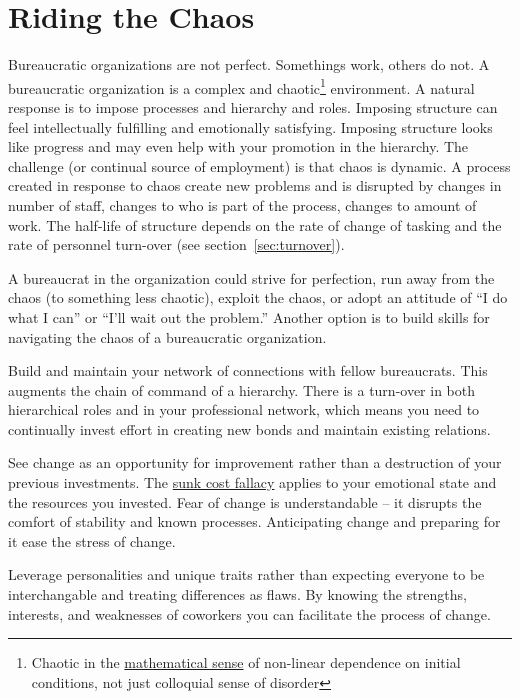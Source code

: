\section{Riding the Chaos}

Bureaucratic organizations are not perfect. Somethings work, others do not. A bureaucratic organization is a complex and chaotic\footnote{Chaotic in the \href{https://en.wikipedia.org/wiki/Chaos_theory}{mathematical sense} of non-linear dependence on initial conditions, not just colloquial sense of disorder} environment. A natural response is to impose processes and hierarchy and roles. Imposing structure can feel intellectually fulfilling and emotionally satisfying. Imposing structure looks like progress and may even help with your promotion in the hierarchy. The challenge (or continual source of employment) is that chaos is dynamic. A process created in response to chaos create new problems and is disrupted by changes in number of staff, changes to who is part of the process, changes to amount of work. The half-life of structure depends on the rate of change of tasking and the rate of personnel turn-over (see section~\ref{sec:turnover}).

A bureaucrat in the organization could strive for perfection, run away from the chaos (to something less chaotic), exploit the chaos, or adopt an attitude of ``I do what I can'' or ``I'll wait out the problem.'' 
Another option is to build skills for navigating the chaos of a bureaucratic organization.

Build and maintain your network of connections with fellow bureaucrats. This augments the chain of command of a hierarchy. There is a turn-over in both hierarchical roles and in your professional network, which means you need to continually invest effort in creating new bonds and maintain existing relations. 

See change as an opportunity for improvement rather than a destruction of your previous investments. The \href{https://en.wikipedia.org/wiki/Sunk_cost}{sunk cost fallacy} applies to your emotional state and the resources you invested. Fear of change is understandable -- it disrupts the comfort of stability and known processes. Anticipating change and preparing for it ease the stress of change.

Leverage personalities and unique traits rather than expecting everyone to be interchangable and treating differences as flaws. 
By knowing the strengths, interests, and weaknesses of coworkers you can facilitate the process of change. 